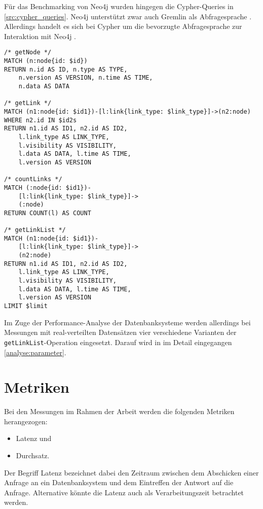 Für das Benchmarking von Neo4j wurden hingegen die  Cypher-Queries in \autoref{src:cypher_queries}. Neo4j unterstützt zwar auch Gremlin als Abfragesprache \cite{gdbms}. Allerdings handelt es sich bei Cypher um die bevorzugte Abfragesprache zur Interaktion mit Neo4j \cite{gdbms}.

\begin{lstlisting}[label=src:cypher_queries,caption={Cypher Queries (regulär)},language=CQL]
/* getNode */
MATCH (n:node{id: $id}) 
RETURN n.id AS ID, n.type AS TYPE, 
    n.version AS VERSION, n.time AS TIME, 
    n.data AS DATA

/* getLink */
MATCH (n1:node{id: $id1})-[l:link{link_type: $link_type}]->(n2:node) 
WHERE n2.id IN $id2s 
RETURN n1.id AS ID1, n2.id AS ID2, 
    l.link_type AS LINK_TYPE, 
    l.visibility AS VISIBILITY, 
    l.data AS DATA, l.time AS TIME, 
    l.version AS VERSION

/* countLinks */
MATCH (:node{id: $id1})-
    [l:link{link_type: $link_type}]->
    (:node) 
RETURN COUNT(l) AS COUNT

/* getLinkList */
MATCH (n1:node{id: $id1})-
    [l:link{link_type: $link_type}]->
    (n2:node) 
RETURN n1.id AS ID1, n2.id AS ID2, 
    l.link_type AS LINK_TYPE, 
    l.visibility AS VISIBILITY, 
    l.data AS DATA, l.time AS TIME, 
    l.version AS VERSION 
LIMIT $limit
\end{lstlisting}

Im Zuge der Performance-Analyse der Datenbanksysteme werden allerdings bei Messungen mit real-verteilten Datensätzen vier verschiedene Varianten der \texttt{getLinkList}-Operation eingesetzt. Darauf wird in im Detail eingegangen \autoref{analyse:parameter}.

\section{Metriken}
\label{analyse:metriken}
Bei den Messungen im Rahmen der Arbeit werden die folgenden Metriken herangezogen: 

\begin{itemize}
    \item Latenz und 
    \item Durchsatz.
\end{itemize}

Der Begriff Latenz bezeichnet dabei den Zeitraum zwischen dem Abschicken einer Anfrage an ein Datenbanksystem und dem Eintreffen der Antwort auf die Anfrage. Alternative könnte die Latenz auch als Verarbeitungszeit betrachtet werden. 

